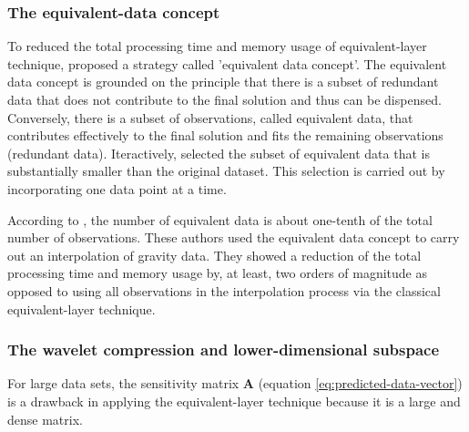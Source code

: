 



\subsubsection{The equivalent-data concept}

To reduced the total processing time and memory usage of equivalent-layer technique, \cite{mendonca-silva1994} proposed a strategy called 'equivalent data concept'.
The equivalent data concept is grounded on the  principle  that there is a subset of redundant data that does not contribute to the final solution and thus can be dispensed.
Conversely, there is a subset of observations, called equivalent data, that  contributes effectively to the final solution and fits the remaining observations (redundant data).
Iteractively, \cite{mendonca-silva1994} selected the subset of equivalent data that is substantially smaller than the original dataset. 
This selection is carried out by incorporating one data point at a time.

According to \cite{mendonca-silva1994}, the number of equivalent data is about one-tenth 
of the total number of observations. 
These authors used the equivalent data concept to carry out an interpolation of gravity data.
They showed a reduction of the total processing time and memory usage by, at least, 
two orders of magnitude as opposed to using all observations in the interpolation process 
via the classical equivalent-layer technique.


\subsubsection{The wavelet compression and lower-dimensional subspace}

For large data sets, the  sensitivity matrix $\mathbf{A}$ (equation \ref{eq:predicted-data-vector}) is a drawback in applying  
the equivalent-layer technique because it is a large and dense matrix.

